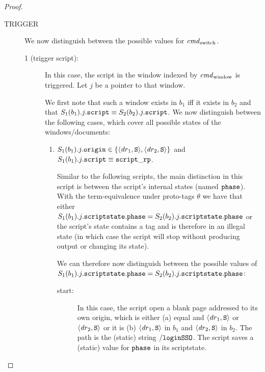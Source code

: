 \documentclass[letterpaper,onecolumn,10pt]{article}
\begin{document}
\begin{proof}

  \begin{description}
    \item[TRIGGER] We now distinguish between the possible 
      values for $\mathit{cmd}_\text{switch}$.
      \begin{description}
      \item[1 (trigger script):] In this case, the script in 
        the window indexed by $\mathit{cmd}_\text{window}$ is 
        triggered. Let $j$ be a pointer to that window.

        We first note that such a window exists in $b_1$ iff 
        it exists in $b_2$ and that $S_1(b_1).j.\mathtt{script} 
        \equiv S_2(b_2).j.\mathtt{script}$. We now distinguish 
        between the following cases, which cover all possible 
        states of the windows/documents:

        \begin{enumerate}
        \item
          $S_1(b_1).j.\mathtt{origin} \in \{\langle\mathit{dr}_1, 
          \mathtt{S}\rangle, \langle\mathit{dr}_2, \mathtt{S}\rangle\}$ and 
          $S_1(b_1).j.\mathtt{script} \equiv \mathtt{script\_rp}$.

          Similar to the following scripts, the main 
          distinction in this script is between the script's 
          internal states (named $\mathtt{phase}$). With the 
          term-equivalence under proto-tags $\theta$ we have 
          that either 
          $S_1(b_1).j.\mathtt{scriptstate}.\mathtt{phase} =
           S_2(b_2).j.\mathtt{scriptstate}.\mathtt{phase}$ or the 
          script's state contains a tag and is therefore in an 
          illegal state (in which case the script will stop 
          without producing output or changing its state).

          We can therefore now distinguish between the 
          possible values of
          $S_1(b_1).j.\mathtt{scriptstate}.\mathtt{phase} =
           S_2(b_2).j.\mathtt{scriptstate}.\mathtt{phase}$:
          \begin{description}
          \item[start:] In this case, the script open a blank
            page addressed to its own origin, which is either 
            (a) equal and $\langle\mathit{dr}_1,\mathtt{S}\rangle$ or 
            $\langle\mathit{dr}_2,\mathtt{S}\rangle$ or it is 
            (b) $\langle\mathit{dr}_1,\mathtt{S}\rangle$ in $b_1$ and
            $\langle\mathit{dr}_2,\mathtt{S}\rangle$ in $b_2$. The path is the 
            (static) string $\mathtt{/loginSSO}$. The script 
            saves a (static) value for $\mathtt{phase}$ in its 
            scriptstate.


\end{description}
\end{enumerate}
\end{description}
\end{description}
\end{proof}
\end{document}
